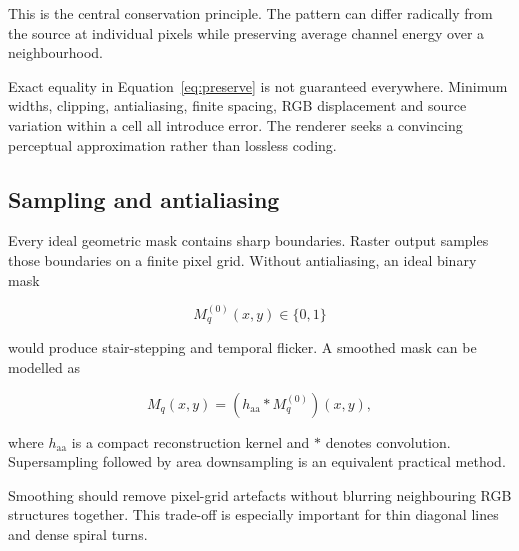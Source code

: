 This is the central conservation principle. The pattern can differ radically from the source at individual pixels while preserving average channel energy over a neighbourhood.

\begin{warningbox}
Exact equality in Equation~\eqref{eq:preserve} is not guaranteed everywhere. Minimum widths, clipping, antialiasing, finite spacing, RGB displacement and source variation within a cell all introduce error. The renderer seeks a convincing perceptual approximation rather than lossless coding.
\end{warningbox}

\subsection{Sampling and antialiasing}

Every ideal geometric mask contains sharp boundaries. Raster output samples those boundaries on a finite pixel grid. Without antialiasing, an ideal binary mask

\begin{equation}
M_q^{(0)}(x,y)\in\{0,1\}
\end{equation}

would produce stair-stepping and temporal flicker. A smoothed mask can be modelled as

\begin{equation}
M_q(x,y)=
\left(h_{\mathrm{aa}}*M_q^{(0)}\right)(x,y),
\label{eq:aa}
\end{equation}

where $h_{\mathrm{aa}}$ is a compact reconstruction kernel and $*$ denotes convolution. Supersampling followed by area downsampling is an equivalent practical method.

Smoothing should remove pixel-grid artefacts without blurring neighbouring RGB structures together. This trade-off is especially important for thin diagonal lines and dense spiral turns.

\clearpage
